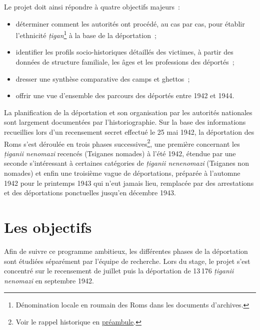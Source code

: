 \documentclass[a4paper,12pt,twoside]{book}
\begin{document}
	            Le projet doit ainsi répondre à quatre objectifs majeurs~:
	            \medskip
                \begin{itemize}
					\item
                    déterminer comment les autorités ont procédé, au cas par cas, pour établir l’ethnicité \og{}\textit{țigan}\fg{}\footnote{Dénomination locale en roumain des Roms dans les documents d'archives.} à la base de la déportation~;
                    \item
                    identifier les profils socio-historiques détaillés des victimes, à partir des données de structure familiale, les âges et les professions des déportés~;
                    \item
                    dresser une synthèse comparative des camps et ghettos~;
                    \item
                    offrir une vue d’ensemble des parcours des déportés entre 1942 et 1944.
                \end{itemize}
                \medskip
                
                La planification de la déportation et son organisation par les autorités nationales sont largement documentées par l'historiographie. Sur la base des informations recueillies lors d'un recensement secret effectué le 25 mai 1942, la déportation des Roms s'est déroulée en trois phases successives\footnote{Voir le rappel historique en \hyperref[rappels]{préambule}.}, une première concernant les \og{}\textit{țiganii nenomazi}\fg{} recencés (Tsiganes nomades) à l'été 1942, étendue par une seconde s'intéressant à certaines catégories de \og{}\textit{țiganii nenenomazi}\fg{} (Tsiganes non nomades) et enfin une troisième vague de déportations, préparée à l'automne 1942 pour le printemps 1943 qui n'eut jamais lieu, remplacée par des arrestations et des déportations ponctuelles jusqu'en décembre 1943.
                
	    \section*{Les objectifs}
			
			Afin de suivre ce programme ambitieux, les différentes phases de la déportation sont étudiées séparément par l'équipe de recherche. Lors du stage, le projet s'est concentré sur le recensement de juillet puis la déportation de 13\,176 \og{}\textit{țiganii nenomazi}\fg{} en septembre 1942.
            
\end{document}
